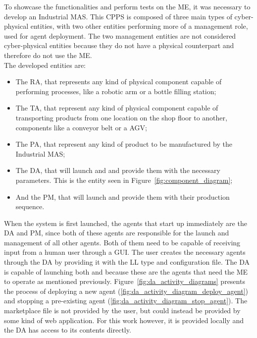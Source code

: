 To showcase the functionalities and perform tests on the \acrlong{ME}, it was necessary to develop an Industrial \acrfull{MAS}. This \acrlong{CPPS} is composed of three main types of cyber-physical entities, with two other entities performing more of a management role, used for agent deployment. The two management entities are not considered cyber-physical entities because they do not have a physical counterpart and therefore do not use the \acrshort{ME}.\\

The developed entities are:
\begin{itemize}
	\item The \acrfull{RA}, that represents any kind of physical component capable of performing processes, like a robotic arm or a bottle filling station;
	\item The \acrfull{TA}, that represent any kind of physical component capable of transporting products from one location on the shop floor to another, components like a conveyor belt or a \acrfull{AGV};
	\item The \acrfull{PA}, that represent any kind of product to be manufactured by the Industrial \acrshort{MAS};
	\item The \acrfull{DA}, that will launch  and  and provide them with the necessary parameters. This is the entity seen in Figure~\ref{fig:component_diagram};
	\item And the \acrfull{PM}, that will launch  and provide them with their production sequence.
\end{itemize}


When the system is first launched, the agents that start up immediately are the \acrfull{DA} and \acrfull{PM}, since both of these agents are responsible for the launch and management of all other agents. Both of them need to be capable of receiving input from a human user through a \acrfull{GUI}. The user creates the necessary agents through the \acrshort{DA} by providing it with the \acrshort{LL} type and configuration file. The \acrshort{DA} is capable of launching both  and  because these are the agents that need the \acrlong{ME} to operate as mentioned previously. Figure~\ref{fig:da_activity_diagrams} presents the process of deploying a new agent (\ref{fig:da_activity_diagram_deploy_agent}) and stopping a pre-existing agent (\ref{fig:da_activity_diagram_stop_agent}). The marketplace file is not provided by the user, but could instead be provided by some kind of web application. For this work however, it is provided locally and the \acrshort{DA} has access to its contents directly.\\

